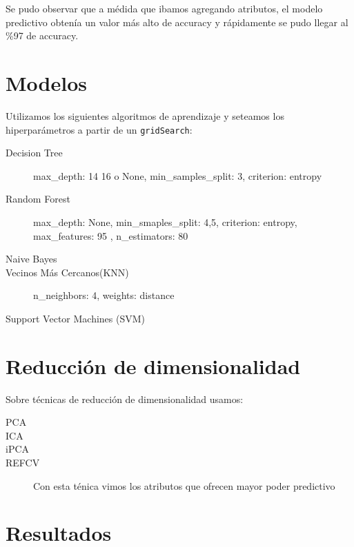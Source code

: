 \documentclass[10pt, a4paper]{article}
\begin{document}
Se pudo observar que a médida que ibamos agregando atributos, el modelo predictivo obtenía un valor más alto de accuracy y rápidamente se pudo llegar al \%97 de accuracy.

\section{Modelos}
Utilizamos los siguientes algoritmos de aprendizaje y seteamos los hiperparámetros a partir de un \texttt{gridSearch}:

\begin{description}
\item [Decision Tree] max\_depth: 14 16 o None, min\_samples_split: 3, criterion: entropy
\item [Random Forest] max_depth: None, min\_smaples\_split: 4,5, criterion: entropy, max\_features: 95 , n_estimators: 80 
\item [Naive Bayes]
\item [Vecinos Más Cercanos(KNN)]  n_neighbors: 4, weights: distance
\item [Support Vector Machines (SVM)]
\end{description}


\section{Reducción de dimensionalidad}
Sobre técnicas de reducción de dimensionalidad usamos:

\begin{description}
\item [PCA]
\item [ICA]
\item [iPCA]
\item [REFCV] Con esta ténica vimos los atributos que ofrecen mayor poder predictivo
\end{description}

\section{Resultados}
\end{document}
